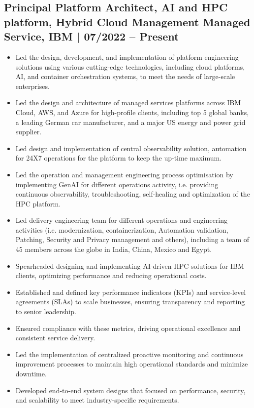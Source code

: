 \documentclass[12pt,]{scrartcl}
\begin{document}
\subsection*{Principal Platform Architect, AI and HPC platform, Hybrid Cloud Management Managed Service, IBM | 07/2022 -- Present}
\begin{itemize}
   \item Led the design, development, and implementation of platform engineering solutions using various cutting-edge technologies, including cloud platforms, AI, and container orchestration systems, to meet the needs of large-scale enterprises.
   \item Led the design and architecture of managed services platforms across IBM Cloud, AWS, and Azure for high-profile clients, including top 5 global banks, a leading German car manufacturer, and a major US energy and power grid supplier.
    \item Led design and implementation of central observability solution, automation for 24X7 operations for the platform to keep the up-time maximum.
    \item Led the operation and management engineering process optimisation by implementing GenAI for different operations activity, i.e. providing continuous observability, troubleshooting, self-healing and optimization of the HPC platform. 
    \item Led delivery engineering team for different operations and engineering activities (i.e. modernization, containerization, Automation validation, Patching, Security and Privacy management and others), including a team of 45 members across the globe in India, China, Mexico and Egypt. 
    \item Spearheaded designing and implementing AI-driven HPC solutions for IBM clients, optimizing performance and reducing operational costs.
    
    \item Established and defined key performance indicators (KPIs) and service-level agreements (SLAs) to scale businesses, ensuring transparency and reporting to senior leadership.
\item Ensured compliance with these metrics, driving operational excellence and consistent service delivery.
\item Led the implementation of centralized proactive monitoring and continuous improvement processes to maintain high operational standards and minimize downtime.
\item Developed end-to-end system designs that focused on performance, security, and scalability to meet industry-specific requirements.


\end{itemize}
\end{document}
